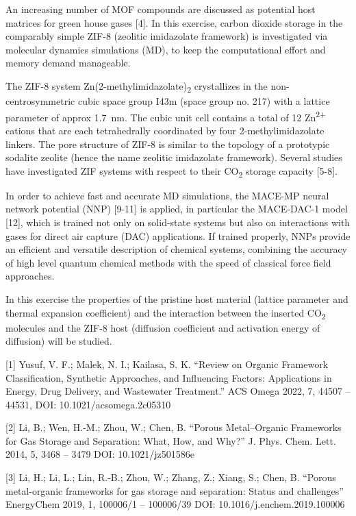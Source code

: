 \documentclass[
  letterpaper,
]{article}
\begin{document}
An increasing number of MOF compounds are discussed as potential host
matrices for green house gases {[}4{]}. In this exercise, carbon dioxide
storage in the comparably simple ZIF-8 (zeolitic imidazolate framework)
is investigated via molecular dynamics simulations (MD), to keep the
computational effort and memory demand manageable.

The ZIF-8 system Zn(2-methylimidazolate)\textsubscript{2} crystallizes
in the non-centrosymmetric cubic space group I43m (space group no. 217)
with a lattice parameter of approx 1.7~nm. The cubic unit cell contains
a total of 12 Zn\textsuperscript{2+} cations that are each tetrahedrally
coordinated by four 2-methylimidazolate linkers. The pore structure of
ZIF-8 is similar to the topology of a prototypic sodalite zeolite (hence
the name zeolitic imidazolate framework). Several studies have
investigated ZIF systems with respect to their CO\textsubscript{2}
storage capacity {[}5-8{]}.

In order to achieve fast and accurate MD simulations, the MACE-MP neural
network potential (NNP) {[}9-11{]} is applied, in particular the
MACE-DAC-1 model {[}12{]}, which is trained not only on solid-state
systems but also on interactions with gases for direct air capture (DAC)
applications. If trained properly, NNPs provide an efficient and
versatile description of chemical systems, combining the accuracy of
high level quantum chemical methods with the speed of classical force
field approaches.

In this exercise the properties of the pristine host material (lattice
parameter and thermal expansion coefficient) and the interaction between
the inserted CO\textsubscript{2} molecules and the ZIF-8 host (diffusion
coefficient and activation energy of diffusion) will be studied.

{[}1{]} Yusuf, V. F.; Malek, N. I.; Kailasa, S. K. ``Review on Organic
Framework Classification, Synthetic Approaches, and Influencing Factors:
Applications in Energy, Drug Delivery, and Wastewater Treatment.'' ACS
Omega 2022, 7, 44507 -- 44531, DOI: 10.1021/acsomega.2c05310

{[}2{]} Li, B.; Wen, H.-M.; Zhou, W.; Chen, B. ``Porous Metal--Organic
Frameworks for Gas Storage and Separation: What, How, and Why?'' J.
Phys. Chem. Lett. 2014, 5, 3468 -- 3479 DOI: 10.1021/jz501586e

{[}3{]} Li, H.; Li, L.; Lin, R.-B.; Zhou, W.; Zhang, Z.; Xiang, S.;
Chen, B. ``Porous metal-organic frameworks for gas storage and
separation: Status and challenges'' EnergyChem 2019, 1, 100006/1 --
100006/39 DOI: 10.1016/j.enchem.2019.100006
\end{document}
